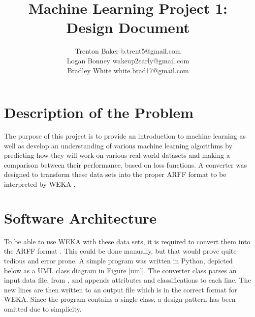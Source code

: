 \documentclass[twoside,11pt]{article}
\begin{document}
\title{Machine Learning Project 1: Design Document}

\author{\name Trenton Baker \email b.trent5@gmail.com \\
       \AND
       \name Logan Bonney \email wakeup2early@gmail.com \\
       \AND
       \name Bradley White \email white.brad17@gmail.com \\
       }

\maketitle

\section{Description of the Problem}

The purpose of this project is to provide an introduction to machine learning as well as develop an understanding of various machine learning algorithms by predicting how they will work on various real-world datasets and making a comparison between their performance, based on loss functions. A converter was designed to transform these data sets into the proper ARFF format to be interpreted by WEKA \citep{weka}.

\section{Software Architecture}
To be able to use WEKA with these data sets, it is required to convert them into the ARFF format \citep{arff}. This could be done manually, but that would prove quite tedious and error prone. A simple program was written in Python, depicted below as a UML class diagram in Figure \ref{uml}. The converter class parses an input data file, from \citep{uci}, and appends attributes and classifications to each line. The new lines are then written to an output file which is in the correct format for WEKA. Since the program contains a single class, a design pattern has been omitted due to simplicity.
\end{document}
